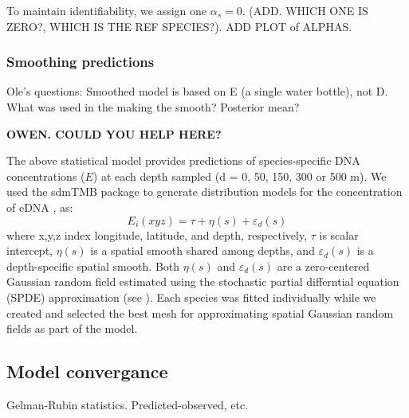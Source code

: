 \documentclass{article}
\begin{document}
To maintain identifiability, we assign one $\alpha_s = 0$. (ADD. WHICH ONE IS ZERO?, WHICH IS THE REF SPECIES?). ADD PLOT of ALPHAS.



\subsubsection*{Smoothing predictions}

Ole's questions:
Smoothed model is based on E (a single water bottle), not D.
What was used in the making the smooth?  Posterior mean?

\textbf{OWEN.  COULD YOU HELP HERE?}

The above statistical model provides predictions of species-specific DNA concentrations ($E$) at each depth sampled (d = 0, 50, 150, 300 or 500 m). We used the sdmTMB package \cite{anderson2022} to generate distribution models for the concentration of eDNA , as:
$$E_i(xyz) = \tau + \eta(s) + \varepsilon_{d}(s)$$
where x,y,z index longitude, latitude, and depth, respectively, $\tau$ is scalar intercept, $\eta(s)$ is a spatial smooth shared among depths, and $\varepsilon_d(s)$ is a depth-specific spatial smooth. Both $\eta(s)$ and $\varepsilon_d(s)$ are a zero-centered Gaussian random field estimated using the stochastic partial differntial equation (SPDE) approximation (see \cite{anderson2022}). Each species was fitted individually while we created and selected the best mesh for approximating spatial Gaussian random fields as part of the model.

\subsection*{Model convergance}

Gelman-Rubin statistics.  Predicted-observed, etc.
\end{document}
